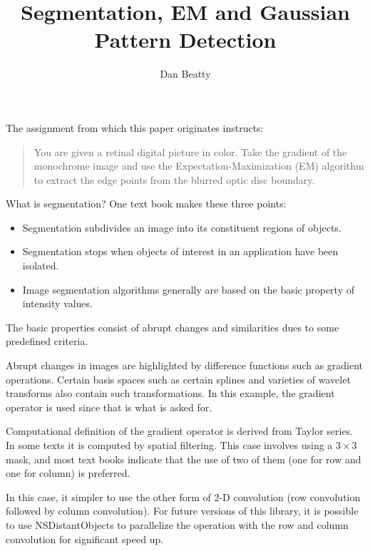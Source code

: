 \documentclass[11pt]{article}
\title{Segmentation, EM and Gaussian Pattern Detection}
\author{Dan Beatty}
\begin{document}
\maketitle


The assignment from which this paper originates instructs:
\begin{quote}
You are given a retinal digital picture in color.  Take the gradient of the monochrome image and use the Expectation-Maximization (EM) algorithm to extract the edge points from the blurred optic disc boundary.
\end{quote}

What is segmentation?  One text book makes these three points:
\begin{itemize}
	\item Segmentation subdivides an image into its constituent regions of objects.
	\item Segmentation stops when objects of interest in an application have been isolated.
	\item Image segmentation algorithms generally are based on the basic property of intensity values.
\end{itemize}

The basic properties consist of abrupt changes and similarities dues to some predefined criteria.  

Abrupt changes in images are highlighted by difference functions such as gradient operations.   Certain basis spaces such as certain splines and varieties of wavelet transforms also contain such transformations.   In this example, the gradient operator is used since that is what is asked for.  

Computational definition of the gradient operator is derived from Taylor series.  In some texts it is computed by spatial filtering.  This case involves using a $3\times 3$ mask, and most text books indicate that the use of two of them (one for row and one for column) is preferred.  

In this case, it simpler to use the other form of 2-D convolution (row convolution followed by column convolution).  For future versions of this library, it is possible to use NSDistantObjects to parallelize the operation with the row and column convolution for significant speed up.  
\end{document}
